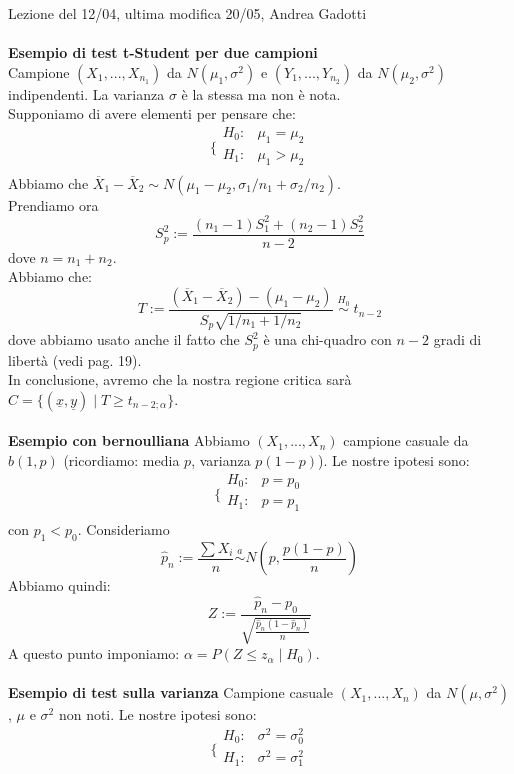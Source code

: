 Lezione del 12/04, ultima modifica 20/05, Andrea Gadotti\\
\\


\textbf{Esempio di test t-Student per due campioni}\\
Campione $(X_1,...,X_{n_1})$ da $N(\mu_1,\sigma^2)$ e $(Y_1,...,Y_{n_2})$ da $N(\mu_2,\sigma^2)$ indipendenti. La varianza $\sigma$ è la stessa ma non è nota.\\
Supponiamo di avere elementi per pensare che:
$$\bigg \{
\begin{array}{rl}
H_0: & \mu_1=\mu_2 \\
H_1: & \mu_1>\mu_2 \\
\end{array}
$$
Abbiamo che $\overline{X}_1 - \overline{X}_2 \sim N(\mu_1 - \mu_2, \sigma_1/n_1 + \sigma_2/n_2)$.\\
Prendiamo ora 
$$S_p^2:= \frac{(n_1-1)S_1^2 + (n_2-1)S_2^2}{n-2}$$ 
dove $n=n_1+n_2$.\\
Abbiamo che:
$$T:= \frac{(\overline{X}_1 - \overline{X}_2)-(\mu_1-\mu_2)}{S_p \sqrt{1/n_1+1/n_2}} \; \stackrel{H_0}{\sim} \; t_{n-2}$$
dove abbiamo usato anche il fatto che $S_p^2$ è una chi-quadro con $n-2$ gradi di libertà (vedi pag. 19).\\
In conclusione, avremo che la nostra regione critica sarà $C=\lbrace (\underline{x},\underline{y}) \mid T \geq t_{n-2;\alpha} \rbrace$.\\
\\
\textbf{Esempio con bernoulliana} Abbiamo $(X_1,...,X_n)$ campione casuale da $b(1,p)$ (ricordiamo: media $p$, varianza $p(1-p)$). Le nostre ipotesi sono:
$$\bigg \{
\begin{array}{rl}
H_0: & p=p_0 \\
H_1: & p=p_1 \\
\end{array}
$$
con $p_1<p_0$. Consideriamo
$$\hat{p}_n := \frac{\sum X_i}{n} \stackrel{a}{\sim} N \left( p, \frac{p(1-p)}{n} \right)$$
Abbiamo quindi:
$$Z:= \frac{\hat{p}_n-p_0}{\sqrt{\frac{\hat{p}_n (1-\hat{p}_n)}{n}}}$$
A questo punto imponiamo: $\alpha = P(Z \leq z_{\alpha} \mid H_0)$.\\
\\
\textbf{Esempio di test sulla varianza} Campione casuale $(X_1,...,X_n)$ da $N(\mu,\sigma^2)$, $\mu$ e $\sigma^2$ non noti. Le nostre ipotesi sono: 
$$\bigg \{
\begin{array}{rl}
H_0: & \sigma^2=\sigma_0^2 \\
H_1: & \sigma^2=\sigma_1^2 \\
\end{array}
$$
